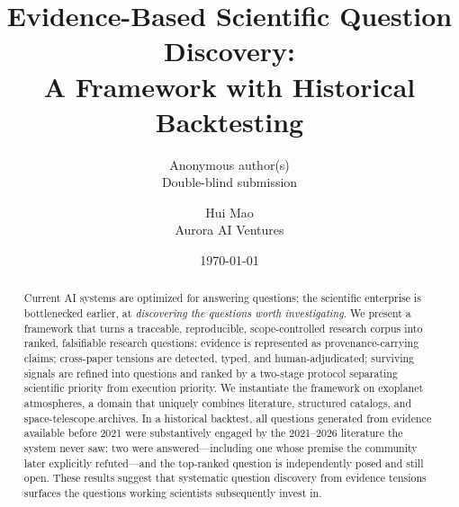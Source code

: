 \documentclass[11pt]{article}
\title{Evidence-Based Scientific Question Discovery:\\
\large A Framework with Historical Backtesting}
\author{Anonymous author(s)\\Double-blind submission}
\author{%
    Hui Mao\\
    Aurora AI Ventures
  }
\date{\today}
\begin{document}
\maketitle

\begin{abstract}
Current AI systems are optimized for answering questions; the scientific
enterprise is bottlenecked earlier, at \emph{discovering the questions
worth investigating}. We present a framework that turns a
traceable, reproducible, scope-controlled research corpus into ranked,
falsifiable research questions: evidence is represented as provenance-carrying
claims; cross-paper tensions are detected, typed, and human-adjudicated;
surviving signals are refined into questions and ranked by a two-stage
protocol separating scientific priority from execution priority. We
instantiate the framework on exoplanet atmospheres, a domain that uniquely
combines literature, structured catalogs, and space-telescope archives.
In a historical backtest, all questions generated from evidence available
before 2021 were substantively engaged by the 2021--2026 literature the
system never saw: two were answered---including one whose premise the
community later explicitly refuted---and the top-ranked question is
independently posed and still open. These results suggest that systematic
question discovery from evidence tensions surfaces the questions working
scientists subsequently invest in.
\end{abstract}











\end{document}
